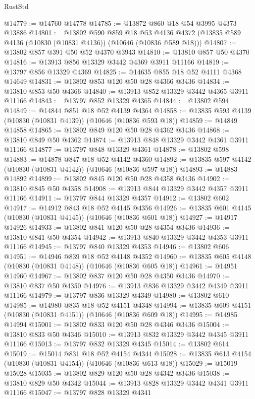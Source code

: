 \begin{lexlean}{RustStd}
\begin{coremodule}
@14779 := @14760 @14778
@14785 := @13872 @860 @18 @54 @3995 @4373 @13886
@14801 := @13802
    @590
    @859
    @18
    @53
    @4136
    @4372
    (@13835 @589 @4136 (@10830 (@10831 @4136)) (@10646 (@10836 @589 @18)))
@14807 := @13802 @857 @391 @50 @52 @4370 @3943
@14810 := @13810 @857 @50 @4370
@14816 := @13913 @856 @13329 @3442 @4369 @3911 @11166
@14819 := @13797 @856 @13329 @4369
@14825 := @14635 @855 @18 @52 @4111 @4368 @14649
@14831 := @13802 @853 @120 @50 @28 @4366 @3436
@14834 := @13810 @853 @50 @4366
@14840 := @13913 @852 @13329 @3442 @4365 @3911 @11166
@14843 := @13797 @852 @13329 @4365
@14844 := @13802 @594
@14849 := @14844 @851 @18 @52 @4139 @4364
@14858 := @13835 @593 @4139 (@10830 (@10831 @4139)) (@10646 (@10836 @593 @18))
@14859 := @14849 @14858
@14865 := @13802 @849 @120 @50 @28 @4362 @3436
@14868 := @13810 @849 @50 @4362
@14874 := @13913 @848 @13329 @3442 @4361 @3911 @11166
@14877 := @13797 @848 @13329 @4361
@14878 := @13802 @598
@14883 := @14878 @847 @18 @52 @4142 @4360
@14892 := @13835 @597 @4142 (@10830 (@10831 @4142)) (@10646 (@10836 @597 @18))
@14893 := @14883 @14892
@14899 := @13802 @845 @120 @50 @28 @4358 @3436
@14902 := @13810 @845 @50 @4358
@14908 := @13913 @844 @13329 @3442 @4357 @3911 @11166
@14911 := @13797 @844 @13329 @4357
@14912 := @13802 @602
@14917 := @14912 @843 @18 @52 @4145 @4356
@14926 := @13835 @601 @4145 (@10830 (@10831 @4145)) (@10646 (@10836 @601 @18))
@14927 := @14917 @14926
@14933 := @13802 @841 @120 @50 @28 @4354 @3436
@14936 := @13810 @841 @50 @4354
@14942 := @13913 @840 @13329 @3442 @4353 @3911 @11166
@14945 := @13797 @840 @13329 @4353
@14946 := @13802 @606
@14951 := @14946 @839 @18 @52 @4148 @4352
@14960 := @13835 @605 @4148 (@10830 (@10831 @4148)) (@10646 (@10836 @605 @18))
@14961 := @14951 @14960
@14967 := @13802 @837 @120 @50 @28 @4350 @3436
@14970 := @13810 @837 @50 @4350
@14976 := @13913 @836 @13329 @3442 @4349 @3911 @11166
@14979 := @13797 @836 @13329 @4349
@14980 := @13802 @610
@14985 := @14980 @835 @18 @52 @4151 @4348
@14994 := @13835 @609 @4151 (@10830 (@10831 @4151)) (@10646 (@10836 @609 @18))
@14995 := @14985 @14994
@15001 := @13802 @833 @120 @50 @28 @4346 @3436
@15004 := @13810 @833 @50 @4346
@15010 := @13913 @832 @13329 @3442 @4345 @3911 @11166
@15013 := @13797 @832 @13329 @4345
@15014 := @13802 @614
@15019 := @15014 @831 @18 @52 @4154 @4344
@15028 := @13835 @613 @4154 (@10830 (@10831 @4154)) (@10646 (@10836 @613 @18))
@15029 := @15019 @15028
@15035 := @13802 @829 @120 @50 @28 @4342 @3436
@15038 := @13810 @829 @50 @4342
@15044 := @13913 @828 @13329 @3442 @4341 @3911 @11166
@15047 := @13797 @828 @13329 @4341

\end{coremodule}
\end{lexlean}
